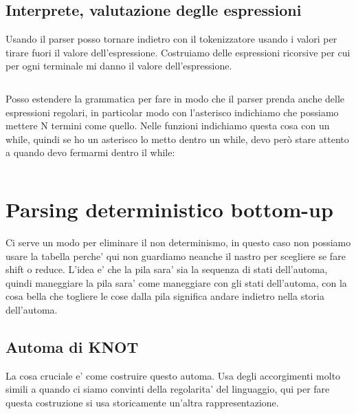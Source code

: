 \subsection{Interprete, valutazione deglle espressioni}
Usando il parser posso tornare indietro con il tokenizzatore usando i valori per tirare fuori il valore dell'espressione. Costruiamo delle espressioni ricorsive per cui per ogni terminale mi danno il valore dell'espressione.

\begin{lstlisting}

\end{lstlisting}

Posso estendere la grammatica per fare in modo che il parser prenda anche delle espressioni regolari, in particolar modo con l'asterisco indichiamo che possiamo mettere N termini come quello. Nelle funzioni indichiamo questa cosa con un while, quindi se ho un asterisco lo metto dentro un while, devo però stare attento a quando devo fermarmi dentro il while:
\begin{lstlisting}

\end{lstlisting}

\section{Parsing deterministico bottom-up}

Ci serve un modo per eliminare il non determinismo, in questo caso non possiamo usare la tabella perche' qui non guardiamo neanche il nastro per scegliere se fare shift o reduce.
L'idea e' che la pila sara' sia la sequenza di stati dell'automa, quindi maneggiare la pila sara' come maneggiare con gli stati dell'automa, con la cosa bella che togliere le cose dalla pila significa andare indietro nella storia dell'automa.

\subsection{Automa di KNOT}
La cosa cruciale e' come costruire questo automa. Usa degli accorgimenti molto simili a quando ci siamo convinti della regolarita' del linguaggio, qui per fare questa costruzione si usa storicamente un'altra rappresentazione.

